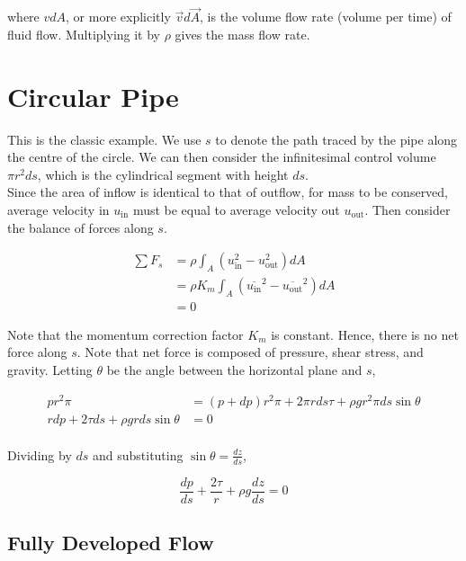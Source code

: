 \documentclass[12pt]{article}
\begin{document}
where $vdA$, or more explicitly $\vec v d\vec A$, is the volume flow rate (volume per time) of fluid flow. Multiplying it by $\rho$ gives the mass flow rate.


\section{Circular Pipe}

This is the classic example. We use $s$ to denote the path traced by the pipe along the centre of the circle. We can then consider the infinitesimal control volume $\pi r^2ds$, which is the cylindrical segment with height $ds$. \\

Since the area of inflow is identical to that of outflow, for mass to be conserved, average velocity in $u_{\text{in}}$ must be equal to average velocity out $u_{\text{out}}$. Then consider the balance of forces along $s$.

\begin{align*}
    \sum F_s &= \rho \int_A \left(u_{\text{in}}^2 - u_{\text{out}}^2\right) dA \\
             &= \rho K_m \int_A \left(\overline{u_{\text{in}}}^2 - \overline{u_{\text{out}}}^2\right) dA \\
             &= 0
\end{align*}

Note that the momentum correction factor $K_m$ is constant. Hence, there is no net force along $s$. Note that net force is composed of pressure, shear stress, and gravity. Letting $\theta$ be the angle between the horizontal plane and $s$,

\begin{align*}
    pr^2\pi &= (p+dp)r^2\pi + 2\pi rds\tau + \rho gr^2\pi ds\sin\theta \\
    rdp + 2\tau ds + \rho g rds\sin\theta &= 0 \\
\end{align*}

Dividing by $ds$ and substituting $\sin\theta = \frac{dz}{ds}$,

\begin{equation}
    \frac{dp}{ds} + \frac{2\tau}{r} + \rho g \frac{dz}{ds} = 0
\end{equation}

\subsection{Fully Developed Flow}
\end{document}
